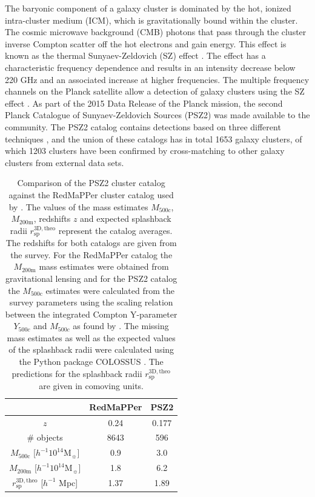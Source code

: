 \documentclass[iop, apjl, twocolappendix, numberedappendix]{emulateapj}
\begin{document}
The baryonic component of a galaxy cluster is dominated by the hot,
ionized  intra-cluster medium (ICM), which is gravitationally bound
within the cluster. The cosmic microwave background (CMB) photons
that pass through the cluster inverse Compton scatter off the hot
electrons and gain energy. This effect is known as the thermal
Sunyaev-Zeldovich (SZ) effect
\citep{sunyaev1970small,sunyaev1980velocity}. The effect has a
characteristic frequency dependence and results in an intensity
decrease below 220 GHz and an associated increase at higher
frequencies. The multiple frequency channels on the Planck satellite
allow a detection of galaxy clusters using the SZ effect
\citep{collaboration2016planck}. As part of the 2015 Data Release of
the Planck mission, the second Planck Catalogue of Sunyaev-Zeldovich
Sources (PSZ2) was made available to the community. The PSZ2 catalog
contains detections based on  three different techniques
\citep{ade2016planck}, and the union of these catalogs has in total
1653 galaxy clusters, of which 1203 clusters have been confirmed by
cross-matching to other galaxy clusters from external data sets. 
\begin{table}
    \centering
    \caption{Comparison of the PSZ2 cluster catalog
    against the RedMaPPer cluster catalog used by
\citet{more2016detection}. The values of the mass estimates
$M_{\mathrm{500c}}$, $M_{\mathrm{200m}}$, redshifts $z$ and expected
splashback radii $r^{\mathrm{3D,theo}}_{\mathrm{sp}}$ represent the
catalog averages. The redshifts for both catalogs are given from the
survey. For the RedMaPPer catalog the $M_{\mathrm{200m}}$ mass
estimates were obtained from gravitational lensing and for the PSZ2
catalog the $M_{\mathrm{500c}}$ estimates were calculated from the
survey parameters using the scaling relation between the integrated
Compton Y-parameter $Y_{500c}$ and $M_{500c}$ as found by
\citet{ade2014planck}. The missing mass estimates as well as the
expected values of the splashback radii were calculated using the
Python package COLOSSUS \citep{diemer2017colossus}. The predictions
for the splashback radii $r^{\mathrm{3D,theo}}_{\mathrm{sp}}$ are
given in comoving units.}
    \label{tab:cluster_catalogs} 
    \begin{tabular}{ccc}
    \hline 
    & RedMaPPer & PSZ2 \\
    \hline 
    $z$ & 0.24 & 0.177 \\
    \hline 
    \# objects & 8643 & 596\\
    \hline
    $M_{\mathrm{500c}}$ [$h^{-1}10^{14} $M$_{\sun}$] & 0.9 & 3.0 \\
    \hline
    $M_{\mathrm{200m}}$ [$h^{-1}10^{14} $M$_{\sun}$] & 1.8 & 6.2\\ 
    \hline
    $r^{\mathrm{3D,theo}}_{\mathrm{sp}}$ [$h^{-1}$ Mpc] & 1.37 & 1.89 \\
    \hline
    \end{tabular} 
\end{table}
\end{document}

